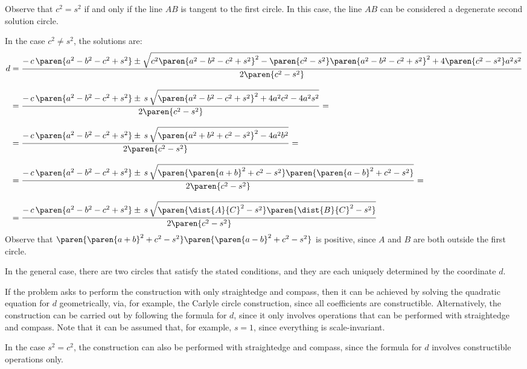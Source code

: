 Observe that $c^2 = s^2$ if and only if the line $AB$ is tangent to the first circle.
In this case, the line $AB$ can be considered a degenerate second solution circle.

\vspace{3ex}
In the case $c^2 \neq s^2$, the solutions are:
\begin{align*}
 d &= \frac{- \, c \, \paren{a^2 - b^2 - c^2 + s^2}
     \pm \sqrt{c^2 \paren{a^2 - b^2 - c^2 + s^2}^2
               - \paren{c^2 - s^2} \paren{a^2 - b^2 - c^2 + s^2}^2
               + 4 \paren{c^2 - s^2} a^2 s^2}}
     {2 \paren{c^2 - s^2}}
   \\[0.3cm]
   &= \frac{- \, c \, \paren{a^2 - b^2 - c^2 + s^2}
     \pm \, s \, \sqrt{\paren{a^2 - b^2 - c^2 + s^2}^2
                       + 4 a^2 c^2 - 4 a^2 s^2}}
     {2 \paren{c^2 - s^2}} =
   \\[0.3cm]
   &= \frac{- \, c \, \paren{a^2 - b^2 - c^2 + s^2}
     \pm \, s \, \sqrt{\paren{a^2 + b^2 + c^2 - s^2}^2
                       - 4 a^2 b^2}}
     {2 \paren{c^2 - s^2}} =
   \\[0.3cm]
   &= \frac{- \, c \, \paren{a^2 - b^2 - c^2 + s^2}
     \pm \, s \, \sqrt{\paren{\paren{a + b}^2 + c^2 - s^2}
                       \paren{\paren{a - b}^2 + c^2 - s^2}}}
     {2 \paren{c^2 - s^2}} =
   \\[0.3cm]
   &= \frac{- \, c \, \paren{a^2 - b^2 - c^2 + s^2}
     \pm \, s \, \sqrt{\paren{\dist{A}{C}^2 - s^2}
                       \paren{\dist{B}{C}^2 - s^2}}}
     {2 \paren{c^2 - s^2}}
\end{align*}
Observe that
$\paren{\paren{a + b}^2 + c^2 - s^2} \paren{\paren{a - b}^2 + c^2 - s^2}$
is positive, since $A$ and $B$ are both outside the first circle.

In the general case, there are two circles that satisfy the stated conditions,
and they are each uniquely determined by the coordinate $d$.

If the problem asks to perform the construction with only straightedge and compass,
then it can be achieved by solving the quadratic equation for $d$ geometrically,
via, for example, the Carlyle circle construction,
since all coefficients are constructible.
Alternatively, the construction can be carried out by following the formula for $d$,
since it only involves operations that can be performed with straightedge and compass.
Note that it can be assumed that, for example, $s = 1$, since everything is scale-invariant.

In the case $s^2 = c^2$, the construction can also be performed with straightedge and compass,
since the formula for $d$ involves constructible operations only.
